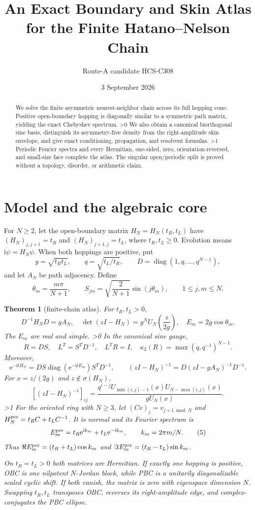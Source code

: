 \documentclass[10pt]{article}
\title{An Exact Boundary and Skin Atlas\\for the Finite Hatano--Nelson Chain}
\author{Route-A candidate HCS-C308}
\date{3 September 2026}
\providecommand{\CRevisionRound}{2}
\newtheorem{theorem}{Theorem}
\newcommand{\ii}{\mathrm{i}}
\newcommand{\e}{\mathrm{e}}
\begin{document}
\maketitle
\begin{abstract}
We solve the finite asymmetric nearest-neighbor chain across its full hopping cone.  Positive open-boundary hopping is diagonally similar to a symmetric path matrix, yielding the exact Chebyshev spectrum.
\ifnum\CRevisionRound>0
We also obtain a canonical biorthogonal sine basis, distinguish its asymmetry-free density from the right-amplitude skin envelope, and give exact conditioning, propagation, and resolvent formulas.
\fi
\ifnum\CRevisionRound>1
Periodic Fourier spectra and every Hermitian, one-sided, zero, orientation-reversed, and small-size face complete the atlas.  The singular open/periodic split is proved without a topology, disorder, or arithmetic claim.
\fi
\end{abstract}

\section{Model and the algebraic core}
For $N\ge2$, let the open-boundary matrix $H_N=H_N(t_R,t_L)$ have
$(H_N)_{j,j+1}=t_R$ and $(H_N)_{j+1,j}=t_L$, where $t_R,t_L\ge0$.
Evolution means $\ii\dot\psi=H_N\psi$.  When both hoppings are positive, put
\[
 g=\sqrt{t_Rt_L},\qquad q=\sqrt{t_L/t_R},\qquad
 D=\operatorname{diag}(1,q,\ldots,q^{N-1}),
\]
and let $A_N$ be path adjacency.  Define
\[
 \theta_m=\frac{m\pi}{N+1},\qquad
 S_{jm}=\sqrt{\frac{2}{N+1}}\sin(j\theta_m),\qquad 1\le j,m\le N.
\]

\begin{theorem}[finite-chain atlas]
For $t_R,t_L>0$,
\[
 D^{-1}H_ND=gA_N,
 \quad \det(zI-H_N)=g^NU_N\!\left(\frac{z}{2g}\right),
 \quad E_m=2g\cos\theta_m .                                      \tag{1}
\]
The $E_m$ are real and simple.
\ifnum\CRevisionRound>0
In the canonical sine gauge,
\[
 R=DS,\quad L^T=S^TD^{-1},\quad L^TR=I,\quad
 \kappa_2(R)=\max(q,q^{-1})^{N-1}.                                \tag{2}
\]
Moreover,
\[
 \e^{-\ii tH_N}=DS\operatorname{diag}(\e^{-\ii tE_m})S^TD^{-1},
 \qquad (zI-H_N)^{-1}=D(zI-gA_N)^{-1}D^{-1}.                       \tag{3}
\]
For $x=z/(2g)$ and $z\notin\sigma(H_N)$,
\[
 [(zI-H_N)^{-1}]_{ij}=
 \frac{q^{i-j}U_{\min(i,j)-1}(x)U_{N-\max(i,j)}(x)}{gU_N(x)}.     \tag{4}
\]
\fi
\ifnum\CRevisionRound>1
For the oriented ring with $N\ge3$, let $(Cv)_j=v_{j+1\bmod N}$ and
$H_N^{\rm per}=t_RC+t_LC^{-1}$.  It is normal and its Fourier spectrum is
\[
 E_m^{\rm per}=t_R\e^{\ii k_m}+t_L\e^{-\ii k_m},\qquad
 k_m=2\pi m/N.                                                     \tag{5}
\]
Thus $\Re E_m^{\rm per}=(t_R+t_L)\cos k_m$ and
$\Im E_m^{\rm per}=(t_R-t_L)\sin k_m$.

On $t_R=t_L>0$ both matrices are Hermitian.  If exactly one hopping is
positive, OBC is one nilpotent $N$-Jordan block, while PBC is a unitarily
diagonalizable scaled cyclic shift.  If both vanish, the matrix is zero with
eigenspace dimension $N$.  Swapping $t_R,t_L$ transposes OBC, reverses its
right-amplitude edge, and complex-conjugates the PBC ellipse.
\fi
\end{theorem}
\end{document}
